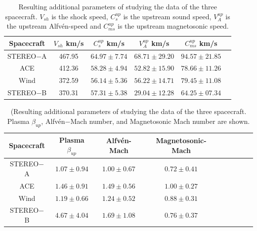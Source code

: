 \documentclass[draft]{agujournal2019}
\begin{document}
\begin{table}[h]
  \centering
  \caption{Resulting additional parameters of studying the data of the three spacecraft. $V_{sh}$ is the shock speed, $C^{up}_s$ is the upstream sound speed, $V^{up}_A$ is the upstream Alfvén-speed and $C^{up}_{ms}$ is the upstream magnetosonic speed.\label{tab:coreapril3}}
\begin{tabular}{cccccc}
\hline
Spacecraft & $V_{sh}$ km/s & $C^{up}_s$ km/s  & $V^{up}_A$ km/s & $C^{up}_{ms}$ km/s \\
 \hline
STEREO$-$A  & 467.95 & $64.97\pm 7.74$     & $68.71\pm 29.20$      & $94.57\pm 21.85$ \\
ACE & 412.36  & $58.28\pm 4.94$     & $52.82\pm 15.90$      & $78.66\pm 11.26$  \\
Wind & 372.59  & $56.14\pm 5.36$     & $56.22\pm 14.71$      & $79.45\pm 11.08$ \\
STEREO$-$B  & 370.31 & $57.31\pm 5.38$     & $29.04\pm 12.28$      & $64.25\pm 07.34$ \\
\end{tabular}
\end{table}

\pagebreak


\begin{table}[h]
  \centering
 \caption{(Resulting additional parameters of studying the data of the three spacecraft. Plasma $\beta_{up}$, Alfvén$-$Mach number, and Magnetosonic Mach number are shown.\label{tab:coreapril4}} 
\begin{tabular}{ccccccccc}
\hline
Spacecraft & Plasma $\beta_{up}$ & Alfvén-Mach & Magnetosonic-Mach \\
 \hline
STEREO$-$A & $1.07\pm 0.94$      & $1.00\pm 0.67$ & $0.72\pm 0.41$ \\
ACE & $1.46\pm 0.91$   & $1.49\pm 0.56$ & $1.00\pm 0.27$ \\
Wind & $1.19\pm 0.66$    & $1.24\pm 0.52$ & $0.88\pm 0.31$ \\
STEREO$-$B & $4.67\pm 4.04$      & $1.69\pm 1.08$ & $0.76\pm 0.37$ \\
\end{tabular}
\end{table}


\pagebreak %
\end{document}
